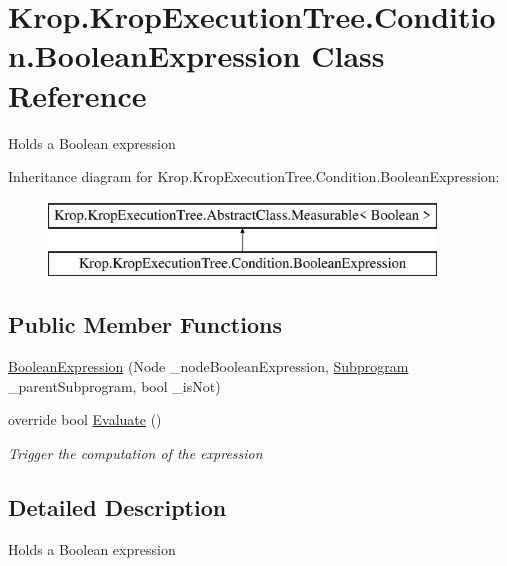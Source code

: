 \hypertarget{class_krop_1_1_krop_execution_tree_1_1_condition_1_1_boolean_expression}{}\section{Krop.\+Krop\+Execution\+Tree.\+Condition.\+Boolean\+Expression Class Reference}
\label{class_krop_1_1_krop_execution_tree_1_1_condition_1_1_boolean_expression}


Holds a Boolean expression  


Inheritance diagram for Krop.\+Krop\+Execution\+Tree.\+Condition.\+Boolean\+Expression\+:\begin{figure}[H]
\begin{center}
\leavevmode
\includegraphics[height=2.000000cm]{class_krop_1_1_krop_execution_tree_1_1_condition_1_1_boolean_expression}
\end{center}
\end{figure}
\subsection*{Public Member Functions}
\begin{DoxyCompactItemize}
\item 
\mbox{\hyperlink{class_krop_1_1_krop_execution_tree_1_1_condition_1_1_boolean_expression_ab7d652f5fcf1d92ce165e553e1f0db2c}{Boolean\+Expression}} (Node \+\_\+node\+Boolean\+Expression, \mbox{\hyperlink{class_krop_1_1_krop_execution_tree_1_1_subprogram}{Subprogram}} \+\_\+parent\+Subprogram, bool \+\_\+is\+Not)
\item 
override bool \mbox{\hyperlink{class_krop_1_1_krop_execution_tree_1_1_condition_1_1_boolean_expression_a0d5dccaa10e9fa7933cf96edd1e670dd}{Evaluate}} ()
\begin{DoxyCompactList}\small\item\em Trigger the computation of the expression \end{DoxyCompactList}\end{DoxyCompactItemize}


\subsection{Detailed Description}
Holds a Boolean expression 



